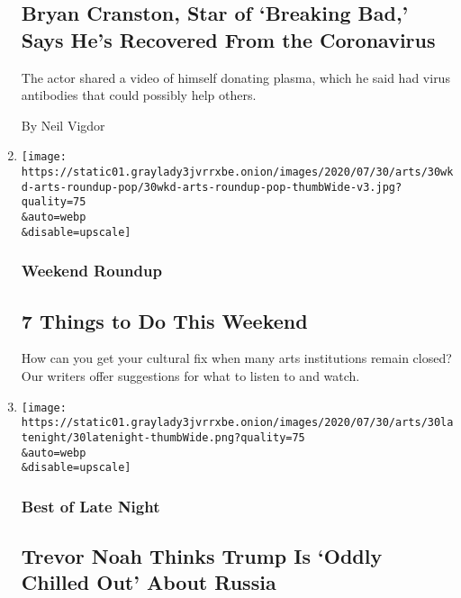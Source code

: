 \begin{enumerate}
  \hypertarget{bryan-cranston-star-of-breaking-bad-says-hes-recovered-from-the-coronavirus}{%
  \subsection{Bryan Cranston, Star of `Breaking Bad,' Says He's
  Recovered From the
  Coronavirus}\label{bryan-cranston-star-of-breaking-bad-says-hes-recovered-from-the-coronavirus}}

  The actor shared a video of himself donating plasma, which he said had
  virus antibodies that could possibly help others.

  By Neil Vigdor
\item
  \href{/2020/07/30/arts/things-to-do-weekend-coronavirus.html}{}

  \texttt{[image: https://static01.graylady3jvrrxbe.onion/images/2020/07/30/arts/30wkd-arts-roundup-pop/30wkd-arts-roundup-pop-thumbWide-v3.jpg?quality=75\\\&auto=webp\\\&disable=upscale]}

  \hypertarget{weekend-roundup}{%
  \subsubsection{Weekend Roundup}\label{weekend-roundup}}

  \hypertarget{7-things-to-do-this-weekend}{%
  \subsection{7 Things to Do This
  Weekend}\label{7-things-to-do-this-weekend}}

  How can you get your cultural fix when many arts institutions remain
  closed? Our writers offer suggestions for what to listen to and watch.
\item
  \href{/2020/07/30/arts/television/trevor-noah-trump-russia.html}{}

  \texttt{[image: https://static01.graylady3jvrrxbe.onion/images/2020/07/30/arts/30latenight/30latenight-thumbWide.png?quality=75\\\&auto=webp\\\&disable=upscale]}

  \hypertarget{best-of-late-night-1}{%
  \subsubsection{Best of Late Night}\label{best-of-late-night-1}}

  \hypertarget{trevor-noah-thinks-trump-is-oddly-chilled-out-about-russia}{%
  \subsection{Trevor Noah Thinks Trump Is `Oddly Chilled Out' About
  Russia}\label{trevor-noah-thinks-trump-is-oddly-chilled-out-about-russia}}


\end{enumerate}
